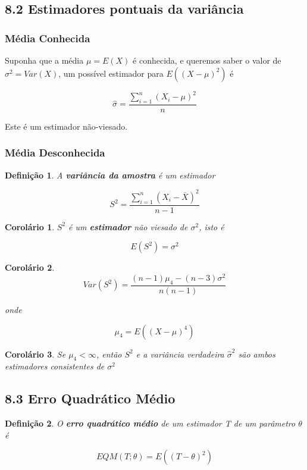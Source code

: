 \documentclass[12pt]{article}
\newtheorem{corollary}{Corolário}[theorem]
\newtheorem{definition}{Definição}
\begin{document}
\subsection*{8.2 Estimadores pontuais da variância}
\subsubsection*{Média Conhecida}
Suponha que a média $\mu = E(X)$ é conhecida, e queremos saber o valor de $\sigma^2 = Var(X)$, um possível estimador para $E((X - \mu)^2)$ é

$$\hat{\sigma} = \frac{\sum_{i = 1}^{n} (X_i - \mu)^2}{n}$$

Este é um estimador não-viesado.

\subsubsection*{Média Desconhecida}
\begin{definition}
    A \textbf{variância da amostra} é um estimador
    
    $$S^2 = \frac{\sum_{i = 1}^n (X_i - \overline{X})^2}{n - 1}$$
\end{definition}

\begin{corollary}
    $S^2$ é um \textbf{estimador} não viesado de $\sigma^2$, isto é
    
    $$E(S^2) = \sigma^2$$
\end{corollary}

\begin{corollary}
    $$Var(S^2) = \frac{(n-1) \mu_4 - (n-3) \sigma^2}{n (n-1)}$$
    
    onde
    
    $$\mu_4 = E((X - \mu)^4)$$
\end{corollary}

\begin{corollary}
    Se $\mu_4 < \infty$, então $S^2$ e a variância verdadeira $\hat{\sigma}^2$ são ambos estimadores consistentes de $\sigma^2$
\end{corollary}

\subsection*{8.3 Erro Quadrático Médio}
\begin{definition}
    O \textbf{erro quadrático médio} de um estimador T de um parâmetro $\theta$ é
    
    $$EQM(T;\theta) = E((T - \theta)^2)$$
\end{definition}
\end{document}
